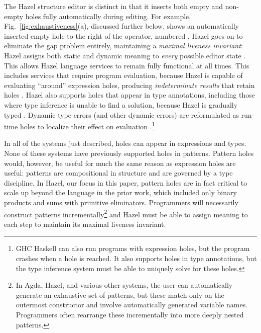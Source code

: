 The Hazel structure editor is distinct in that it inserts both empty and non-empty holes fully automatically during editing.
For example, Fig.~\ref{fig:exhaustiveness}(a), discussed further below, shows an automatically inserted empty hole to the right of the \li{::} operator, numbered . Hazel goes on to eliminate the gap problem entirely, maintaining a \emph{maximal liveness invariant}: Hazel assigns both static and dynamic meaning to \emph{every} possible editor state \cite{DBLP:conf/popl/OmarVHAH17, DBLP:journals/pacmpl/OmarVCH19}. This allows Hazel language services to remain fully functional at all
times. This includes services that require program evaluation, because Hazel is capable of evaluating ``around'' 
expression holes, producing \emph{indeterminate results} that retain holes \cite{DBLP:journals/pacmpl/OmarVCH19}. Hazel also supports holes that appear in type annotations, including those where type inference is unable to find a solution, because Hazel is gradually typed \cite{DBLP:conf/snapl/SiekVCB15}. Dynamic type errors (and other dynamic errors) are reformulated as run-time holes to localize their effect on evaluation \cite{DBLP:journals/pacmpl/OmarVCH19}.\footnote{GHC Haskell can also run programs with expression holes, but the program crashes when a hole is reached. It also supports holes in type annotations, but the type inference system must be able to uniquely solve for these holes.}

In all of the systems just described, 
holes can appear in expressions and types.
None of these systems have previously supported holes in patterns. 
Pattern holes would, however, be useful for much the same reason as expression holes are useful: patterns are compositional in structure and are governed by a type discipline.
In Hazel, our focus in this paper, pattern holes are in fact critical to scale up beyond the language in the prior work, which included only binary products and sums with primitive eliminators. Programmers will necessarily construct patterns incrementally\footnote{In Agda, Hazel, and various other systems, the user can automatically generate an exhaustive set of patterns, but these match only on the outermost constructor and involve automatically generated variable names. Programmers often rearrange these incrementally into more deeply nested patterns.} and Hazel must be able to assign meaning to each step to maintain its maximal liveness invariant.

